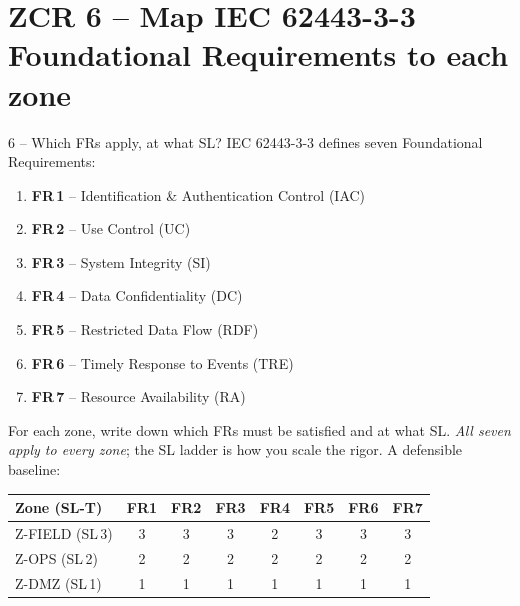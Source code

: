 \documentclass[11pt,a4paper]{article}
\begin{document}
\section*{ZCR 6 -- Map IEC 62443-3-3 Foundational Requirements to each zone}

\begin{stepbox}{6 -- Which FRs apply, at what SL?}
IEC 62443-3-3 defines seven Foundational Requirements:
\begin{enumerate}\setlength{\itemsep}{0pt}
  \item \textbf{FR\,1} -- Identification \& Authentication Control (IAC)
  \item \textbf{FR\,2} -- Use Control (UC)
  \item \textbf{FR\,3} -- System Integrity (SI)
  \item \textbf{FR\,4} -- Data Confidentiality (DC)
  \item \textbf{FR\,5} -- Restricted Data Flow (RDF)
  \item \textbf{FR\,6} -- Timely Response to Events (TRE)
  \item \textbf{FR\,7} -- Resource Availability (RA)
\end{enumerate}
For each zone, write down which FRs must be satisfied and at what SL. \emph{All seven apply to every zone}; the SL ladder is how you scale the rigor. A defensible baseline:
\medskip

\noindent\small
\begin{tabular}{@{}p{} c c c c c c c@{}}
\toprule
\textbf{Zone (SL-T)} & \textbf{FR1} & \textbf{FR2} & \textbf{FR3} & \textbf{FR4} & \textbf{FR5} & \textbf{FR6} & \textbf{FR7} \\
\midrule
Z-FIELD (SL\,3) & 3 & 3 & 3 & 2 & 3 & 3 & 3 \\
Z-OPS   (SL\,2) & 2 & 2 & 2 & 2 & 2 & 2 & 2 \\
Z-DMZ   (SL\,1) & 1 & 1 & 1 & 1 & 1 & 1 & 1 \\
\bottomrule
\end{tabular}
\medskip


\end{stepbox}
\end{document}
